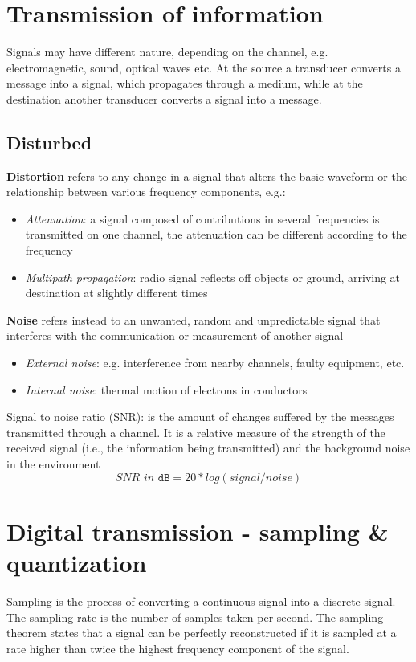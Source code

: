 \section{Transmission of information}
Signals may have different nature,
depending on the channel, e.g. electromagnetic, sound, optical waves etc.
At the source a transducer converts a
message into a signal, which propagates
through a medium, while at the destination another transducer converts a signal into a message.

\subsection{Disturbed}
\textbf{Distortion} refers to any change in a signal that alters the basic waveform or the
relationship between various
frequency components, e.g.:
\begin{itemize}
   \item \textit{Attenuation}: a signal composed of contributions in several frequencies is
   transmitted on one channel, the attenuation can be different according to
   the frequency
   \item \textit{Multipath propagation}: radio signal reflects off objects or ground, arriving at destination at slightly different times
\end{itemize}

\textbf{Noise} refers instead to an unwanted, random and unpredictable signal that interferes with the communication or measurement of another signal
\begin{itemize}
   \item \textit{External noise}: e.g. interference from nearby channels, faulty equipment, etc.
   \item \textit{Internal noise}: thermal motion of electrons in conductors
\end{itemize} 

Signal to noise ratio (SNR): is the amount of changes suffered by the messages transmitted through a channel.
It is a relative measure of the strength of the received signal (i.e., the information being transmitted) and the background noise in the environment
\[\textit{SNR in }\texttt{dB} = 20*log(signal/noise)\]

\section{Digital transmission - sampling \& quantization}
\begin{definition}[Sampling]
   Sampling is the process of converting a continuous signal into a discrete signal.
   The sampling rate is the number of samples taken per second.
   The sampling theorem states that a signal can be perfectly reconstructed if it is sampled at a rate higher than twice the highest frequency component of the signal.
\end{definition}

